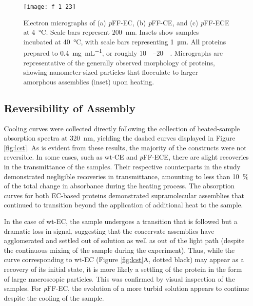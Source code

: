 \begin{refsection}
\begin{figure}[h!] \centering \texttt{[image: f\_1\_23]}
    \caption{Electron micrographs of (a) \emph{p}FF-EC, (b) \emph{p}FF-CE, and
    (c) \emph{p}FF-ECE at \SI{4}{\celsius}. Scale bars represent \SI{200}{\nm}.
    Insets show samples incubated at \SI{40}{\celsius}, with scale bars
    representing \SI{1}{\um}. All proteins prepared to \SI{0.4}{\mg\per\mL}, or
    roughly \SIrange{10}{20}{\micro\moLar}. Micrographs are representative of
    the generally observed morphology of proteins, showing nanometer-sized
    particles that flocculate to larger amorphous assemblies (inset) upon heating.}
    \label{fig:block_EM_1}
\end{figure}

\subsection{Reversibility of Assembly}

Cooling curves were collected directly following the collection of heated-sample
absorption spectra at \SI{320}{\nm}, yielding the dashed curves displayed in
Figure \ref{fig:lcst}. As is evident from these results, the majority of the
constructs were not reversible. In some cases, such as wt-CE and \emph{p}FF-ECE,
there are slight recoveries in the transmittance of the samples. Their
respective counterparts in the study demonstrated negligible recoveries in
transmittance, amounting to less than \SI{10}{\percent} of the total change in
absorbance during the heating process. The absorption curves for both EC-based
proteins demonstrated supramolecular assemblies that continued to transition
beyond the application of additional heat to the sample.

In the case of wt-EC, the sample undergoes a transition that is followed but a
dramatic loss in signal, suggesting that the coacervate assemblies have
agglomerated and settled out of solution as well as out of the light path
(despite the continuous mixing of the sample during the experiment). Thus, while
the curve corresponding to wt-EC (Figure \ref{fig:lcst}A, dotted black) may
appear as a recovery of its initial state, it is more likely a settling of the
protein in the form of large macroscopic particles. This was confirmed by visual
inspection of the samples. For \emph{p}FF-EC, the evolution of a more turbid
solution appears to continue despite the cooling of the sample.


\end{refsection}

